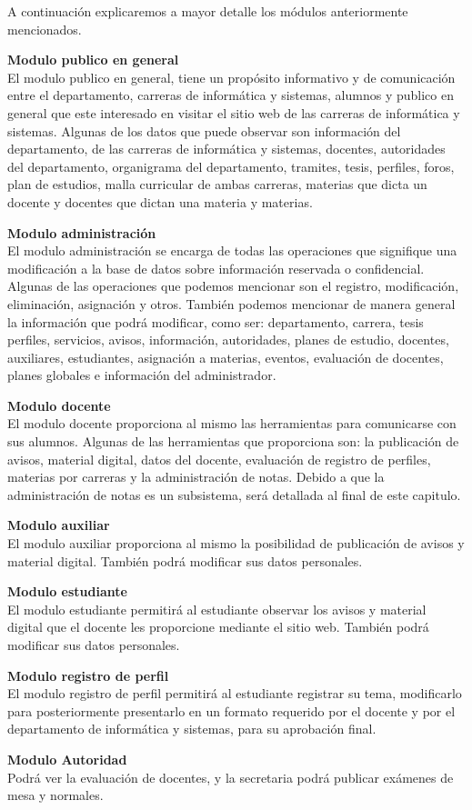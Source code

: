 \documentclass[10pt,letterpaper,twoside]{article}
\newcommand{\btext}[1]{
    \vspace{10mm}
    {{\textcolor{titlecolor}{\large{\textbf{\textsf{#1}}}}}}
    \vspace{5mm}
    \\
}
\newcommand{\ctext}[1]{
    \vspace{5mm}
    {{\textcolor{titlecolor}{\large{\textbf{\textsf{#1}}}}}}
    \\
}
\newcommand{\blankpage}{
\newpage
\thispagestyle{empty}
\mbox{}
\newpage
}
\begin{document}
\begin{multicols}{2}
A continuación explicaremos a mayor detalle los módulos anteriormente mencionados.

\btext{Modulo publico en general}
El modulo publico en general, tiene un propósito informativo y de comunicación entre el departamento, carreras de informática y sistemas, alumnos y publico en general que este interesado en visitar el sitio web de las carreras de informática y sistemas. Algunas de los datos que puede observar son información del departamento, de las carreras de informática y sistemas, docentes, autoridades del departamento, organigrama del departamento, tramites, tesis, perfiles, foros, plan de estudios, malla curricular de ambas carreras, materias que dicta un docente y docentes que dictan una materia y materias.

\ctext{Modulo administración}
El modulo administración se encarga de todas las operaciones que signifique una modificación a la base de datos sobre información reservada o confidencial. Algunas de las operaciones que podemos mencionar son el registro, modificación, eliminación, asignación y otros. También podemos mencionar de manera general la información que podrá modificar, como ser: departamento, carrera, tesis perfiles, servicios, avisos, información, autoridades, planes de estudio, docentes, auxiliares, estudiantes, asignación a materias, eventos, evaluación de docentes, planes globales e información del administrador.

\ctext{Modulo docente}
El modulo docente proporciona al mismo las herramientas para comunicarse con sus alumnos. Algunas de las herramientas que proporciona son: la publicación de avisos, material digital, datos del docente, evaluación de registro de perfiles, materias por carreras y la administración de notas. Debido a que la administración de notas es un subsistema, será detallada al final de este capitulo.

\ctext{Modulo auxiliar}
El modulo auxiliar proporciona al mismo la posibilidad de publicación de avisos y material digital. También podrá modificar sus datos personales.

\ctext{Modulo estudiante}
El modulo estudiante permitirá al estudiante observar los avisos y material digital que el docente les proporcione mediante el sitio web. También podrá modificar sus datos personales.

\ctext{Modulo registro de perfil}
El modulo registro de perfil permitirá al estudiante registrar su tema, modificarlo para posteriormente presentarlo en un formato requerido por el docente y por el departamento de informática y sistemas, para su aprobación final.

\ctext{Modulo Autoridad}
Podrá ver la evaluación de docentes, y la secretaria podrá publicar exámenes de mesa y normales.

\end{multicols}
\clearpage
\pagebreak
\blankpage
\end{document}
